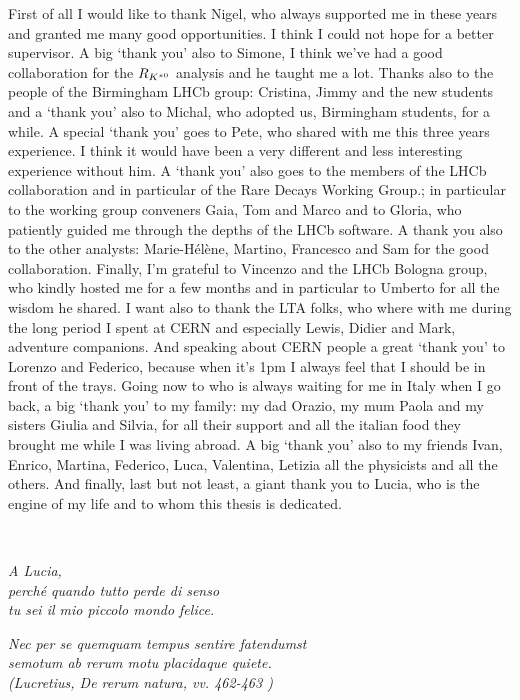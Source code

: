 First of all I would like to thank Nigel, who always supported me in these years and
granted me many good opportunities. I think I could not hope for a better supervisor.
A big `thank you' also to Simone, I think we've had a good collaboration for the $R_{K^{*0}}$ analysis
and he taught me a lot. Thanks also to the people of the Birmingham LHCb group:
Cristina, Jimmy and the new students and a `thank you' also to Michal, who adopted us, Birmingham students, for a while.
A special `thank you' goes to Pete, who shared with me this three years experience.
I think it would have been a very different and less interesting experience without him.
A `thank you' also goes to the members of the LHCb collaboration and in particular of the Rare
Decays Working Group.; in particular to the working group conveners Gaia, Tom and Marco
and to Gloria, who patiently guided me through the depths of the LHCb software.
A thank you also to the other \RKst analysts: Marie-H\'el\`ene, Martino, Francesco and Sam for the good collaboration.
Finally, I'm grateful to Vincenzo and the LHCb Bologna group, who kindly hosted me
for a few months and in particular to Umberto for all the wisdom he shared. 
I want also to thank the LTA folks, who where with me during the long period I spent at CERN
and especially Lewis, Didier and Mark, adventure companions. And speaking about CERN people
a great `thank you' to Lorenzo and Federico, because when it's 1pm I always feel that I should be in front of the trays.
Going now to who is always waiting for me in Italy when I go back, a big `thank you' to my
family: my dad Orazio, my mum Paola and my sisters Giulia and
Silvia, for all their support and all the italian food they brought me while I was living abroad.
A big `thank you' also to my friends Ivan, Enrico, Martina, Federico, Luca, Valentina, Letizia
all the physicists and all the others. And finally, last but not least, a giant thank you to Lucia, 
who is the engine of my life and to whom this thesis is dedicated.

\cleardoublepage
~

\begin{flushright}
  \emph{A Lucia, \\
  perch\'{e} quando tutto perde di senso \\
  tu sei il mio piccolo mondo felice.}
  
  \vspace{10cm}
  
   \emph{
   Nec per se quemquam tempus sentire fatendumst \\
   semotum ab rerum motu placidaque quiete. \\
   (Lucretius, De rerum natura, vv. 462-463 )
   } 
\end{flushright}

\cleardoublepage
